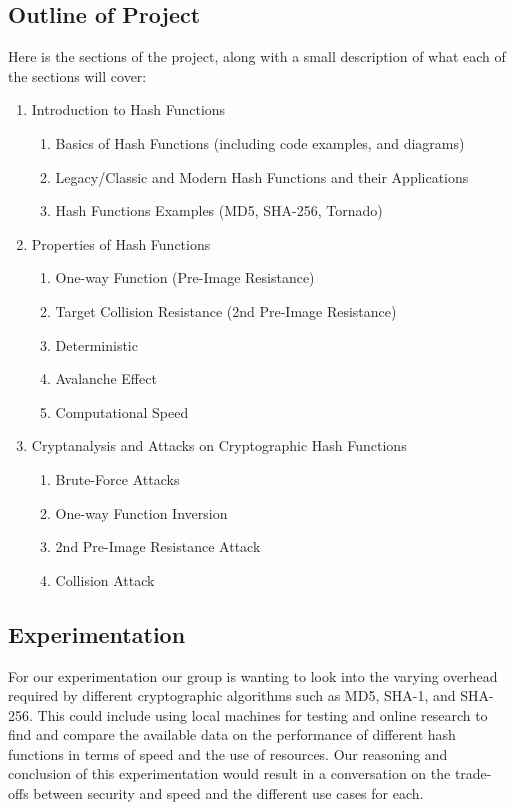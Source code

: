 \documentclass[12pt,english]{article}
\begin{document}
\subsection{Outline of Project}
Here is the sections of the project, along with a small description 
of what each of the sections will cover:
\begin{enumerate}[{\bf (a.)}]
    \item Introduction to Hash Functions
    \begin{enumerate}
        \item Basics of Hash Functions (including code examples, and diagrams)
        \item Legacy/Classic and Modern Hash Functions and their Applications
        \item Hash Functions Examples (MD5, SHA-256, Tornado)
    \end{enumerate} 
    \item Properties of Hash Functions
    \begin{enumerate}
        \item One-way Function (Pre-Image Resistance)
        \item Target Collision Resistance (2nd Pre-Image Resistance)
        \item Deterministic
        \item Avalanche Effect
        \item Computational Speed
    \end{enumerate}
    \item Cryptanalysis and Attacks on Cryptographic Hash Functions
    \begin{enumerate}
        \item Brute-Force Attacks
        \item One-way Function Inversion
        \item 2nd Pre-Image Resistance Attack
        \item Collision Attack
    \end{enumerate}
\end{enumerate}

\subsection{Experimentation}
For our experimentation our group is wanting to look into 
the varying overhead required by different cryptographic 
algorithms such as MD5, SHA-1, and SHA-256. 
This could include using local machines for testing and online 
research to find and compare the available data on the performance 
of different hash functions in terms of speed and the use of 
resources. Our reasoning and conclusion of this experimentation 
would result in a conversation on the trade-offs between security 
and speed and the different use cases for each.
\end{document}
